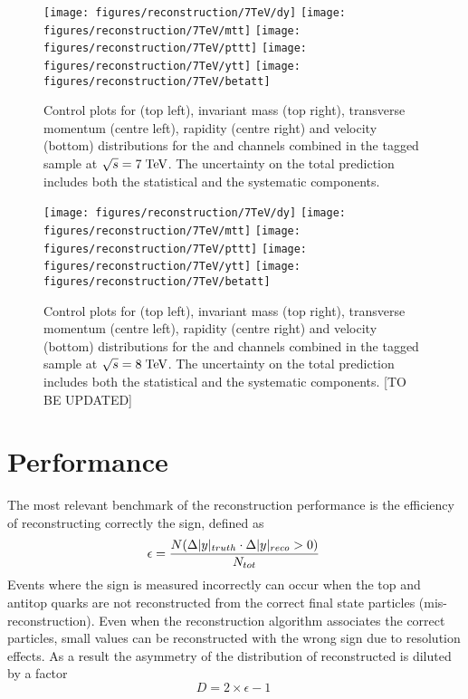 \begin{figure}[!htb]\centering
  \texttt{[image: figures/reconstruction/7TeV/dy]}
  \texttt{[image: figures/reconstruction/7TeV/mtt]}
  \texttt{[image: figures/reconstruction/7TeV/pttt]}
  \texttt{[image: figures/reconstruction/7TeV/ytt]}
  \texttt{[image: figures/reconstruction/7TeV/betatt]}
  \caption[Control plots for reconstructed quantities at $\sqrt{s} = 7
  \TeV{}$]{Control plots for \dy{} (top left), invariant mass \mtt{} 
    (top right), transverse momentum \pttt{} (centre left), rapidity
    \ytt{} (centre right) and velocity \betatt{} (bottom)
    distributions for the \ejets{} and \mujets{} channels combined in the
    tagged sample at $\sqrt{s} = 7 \TeV{}$. The uncertainty on the
    total prediction includes both the statistical and the systematic
    components.} 
  \label{fig:datamcreco2011}
\end{figure}

\begin{figure}[!htb]\centering
  \texttt{[image: figures/reconstruction/7TeV/dy]}
  \texttt{[image: figures/reconstruction/7TeV/mtt]}
  \texttt{[image: figures/reconstruction/7TeV/pttt]}
  \texttt{[image: figures/reconstruction/7TeV/ytt]}
  \texttt{[image: figures/reconstruction/7TeV/betatt]}
  \caption[Control plots for reconstructed quantities at $\sqrt{s} = 8
  \TeV{}$]{Control plots for \dy{} (top left), invariant mass \mtt{} 
    (top right), transverse momentum \pttt{} (centre left), rapidity
    \ytt{} (centre right) and velocity \betatt{} (bottom)
    distributions for the \ejets{} and \mujets{} channels combined in the
    tagged sample at $\sqrt{s} = 8 \TeV{}$. The uncertainty on the
    total prediction includes both the statistical and the systematic
    components. [TO BE UPDATED]} 
  \label{fig:datamcreco2012}
\end{figure}


\section{Performance}

The most relevant benchmark of the reconstruction performance is the
efficiency of reconstructing correctly the \dy{} sign, defined as
\begin{equation}
  \label{eq:dysign}
  \epsilon = \frac{N(\mbox{$\Delta|y|$}{}_{truth}\cdot\mbox{$\Delta|y|$}{}_{reco}>0)}{N_{tot}}\phantom{.}
\end{equation}
Events where the \dy{} sign is measured incorrectly can occur when the top and
antitop quarks are not reconstructed from the correct final
state particles (mis-reconstruction). Even when the reconstruction
algorithm associates the correct particles, small \dy{} values can be
reconstructed with the wrong sign due to resolution effects.
As a result the asymmetry of the distribution of reconstructed \dy{}
is diluted by a factor 
\begin{equation}
  \label{eq:dilution}
D = 2\times{}\epsilon - 1\phantom{.}
\end{equation}  
 
